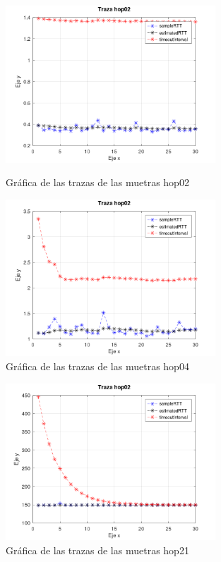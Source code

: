 \begin{figure}[H]
	\centering
	\includegraphics[width=0.7\textwidth]{img/trazaHop02.png}
	\caption{Gr\'afica de las trazas de las muetras hop02}
    
	\includegraphics[width=0.7\textwidth]{img/trazaHop04.png}
	\caption{Gr\'afica de las trazas de las muetras hop04}
\end{figure}

\begin{figure}[H]
	\centering
	\includegraphics[width=0.7\textwidth]{img/trazaHop21.png}
	\caption{Gr\'afica de las trazas de las muetras hop21}
	\label{fig:hop21Graph}
\end{figure}

